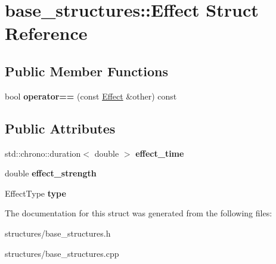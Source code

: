 \hypertarget{structbase__structures_1_1Effect}{}\section{base\+\_\+structures\+:\+:Effect Struct Reference}
\label{structbase__structures_1_1Effect}
\subsection*{Public Member Functions}
\begin{DoxyCompactItemize}
\item 
\mbox{\label{structbase__structures_1_1Effect_a8da8f33ff94086d1236531a43cd63aff}} 
bool {\bfseries operator==} (const \hyperlink{structbase__structures_1_1Effect}{Effect} \&other) const
\end{DoxyCompactItemize}
\subsection*{Public Attributes}
\begin{DoxyCompactItemize}
\item 
\mbox{\label{structbase__structures_1_1Effect_a46a6b781c61f2a53a8b0fc127a9945fb}} 
std\+::chrono\+::duration$<$ double $>$ {\bfseries effect\+\_\+time}
\item 
\mbox{\label{structbase__structures_1_1Effect_afbc715a81958008657971c056d0d6352}} 
double {\bfseries effect\+\_\+strength}
\item 
\mbox{\label{structbase__structures_1_1Effect_ac2409688622c3ca9003f2ef22e782e9f}} 
Effect\+Type {\bfseries type}
\end{DoxyCompactItemize}


The documentation for this struct was generated from the following files\+:\begin{DoxyCompactItemize}
\item 
structures/base\+\_\+structures.\+h\item 
structures/base\+\_\+structures.\+cpp\end{DoxyCompactItemize}
